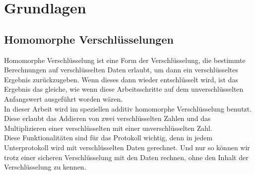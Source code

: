 \chapter{Grundlagen}


\section{Homomorphe Verschlüsselungen}
Homomorphe Verschlüsselung ist eine Form der Verschlüsselung, die bestimmte Berechnungen auf verschlüsselten Daten erlaubt, um dann ein verschlüsseltes Ergebnis zurückzugeben. Wenn dieses dann wieder entschlüsselt wird, ist das Ergebnis das gleiche, wie wenn diese Arbeitsschritte auf dem unverschlüsselten Anfangswert ausgeführt worden wären. \cite{Yi2014} \\
In dieser Arbeit wird im speziellen additiv homomorphe Verschlüsselung benutzt. Diese  erlaubt das Addieren von zwei verschlüsselten Zahlen und das Multiplizieren einer verschlüsselten mit einer unverschlüsselten Zahl.\\
Diese Funktionalitäten sind für das Protokoll wichtig, denn in jedem Unterprotokoll wird mit verschlüsselten Daten gerechnet. Und nur so können wir trotz einer sicheren Verschlüsselung mit den Daten rechnen, ohne den Inhalt der Verschlüsselung zu kennen.
